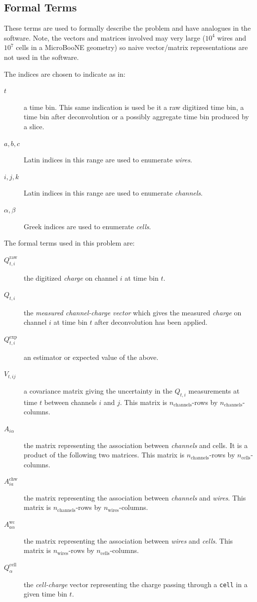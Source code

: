 \documentclass[letter]{article}
\def\mQraw{Q^{\mathrm{raw}}_{t,i}}
\def\Qraw{$\mQraw$\xspace}
\def\mQdec{Q_{t,i}}
\def\Qdec{$\mQdec$\xspace}
\def\mQexp{Q^{\mathrm{exp}}_{t,i}}
\def\Qexp{$\mQexp$\xspace}
\def\mVcov{V_{t,ij}}
\def\Vcov{$\mVcov$\xspace}
\def\mAchc{A_{i\alpha}}
\def\Achc{$\mAchc$\xspace}
\def\mAchw{A^{\mathrm{chw}}_{ia}}
\def\Achw{$\mAchw$\xspace}
\def\mAwc{A^{\mathrm{wc}}_{a\alpha}}
\def\Awc{$\mAwc$\xspace}
\def\mQcell{Q^{\mathrm{cell}}_\alpha}
\def\Qcell{$\mQcell$\xspace}
\begin{document}
\subsection{Formal Terms}

These terms are used to formally describe the problem and have
analogues in the software.
Note, the vectors and matrices involved may very large ($10^4$ wires
and $10^7$ cells in a MicroBooNE geometry) so naive vector/matrix
representations are not used in the software.

\noindent The indices are chosen to indicate as in:
\begin{description}
\item[$t$] a time bin.
  This same indication is used be it a raw digitized time bin, a time
  bin after deconvolution or a possibly aggregate time bin produced by
  a slice.
\item[$a,b,c$] Latin indices in this range are used to enumerate \textit{wires}.
\item[$i,j,k$] Latin indices in this range are used to enumerate \textit{channels}.
\item[$\alpha,\beta$] Greek indices are used to enumerate \textit{cells}.
\end{description}

\noindent The formal terms used in this problem are:
\begin{description}
\item[\Qraw] the digitized \textit{charge} on channel $i$ at
  time bin $t$.
\item[\Qdec] the \textit{measured channel-charge vector} which gives the measured \textit{charge} on channel $i$ at
  time bin $t$ after deconvolution has been applied.
\item[\Qexp] an estimator or expected value of the above.
\item[\Vcov] a covariance matrix giving the 
  uncertainty in the \Qdec measurements at time $t$ between channels
  $i$ and $j$.
  This matrix is $n_\mathrm{channels}$-rows by $n_\mathrm{channels}$-columns.
\item[\Achc] the matrix representing the association between \textit{channels} and {cells}.
  It is a product of the following two matrices.
  This matrix is $n_\mathrm{channels}$-rows by $n_\mathrm{cells}$-columns.
\item[\Achw] the matrix representing the association between
  \textit{channels} and \textit{wires}.
  This matrix is $n_\mathrm{channels}$-rows by $n_\mathrm{wires}$-columns.
\item[\Awc] the matrix representing the association between
  \textit{wires} and \textit{cells}.
  This matrix is $n_\mathrm{wires}$-rows by $n_\mathrm{cells}$-columns.
\item[\Qcell] the \textit{cell-charge} vector representing the charge passing
  through a \texttt{cell} in a given time bin $t$.
\end{description}
\end{document}
